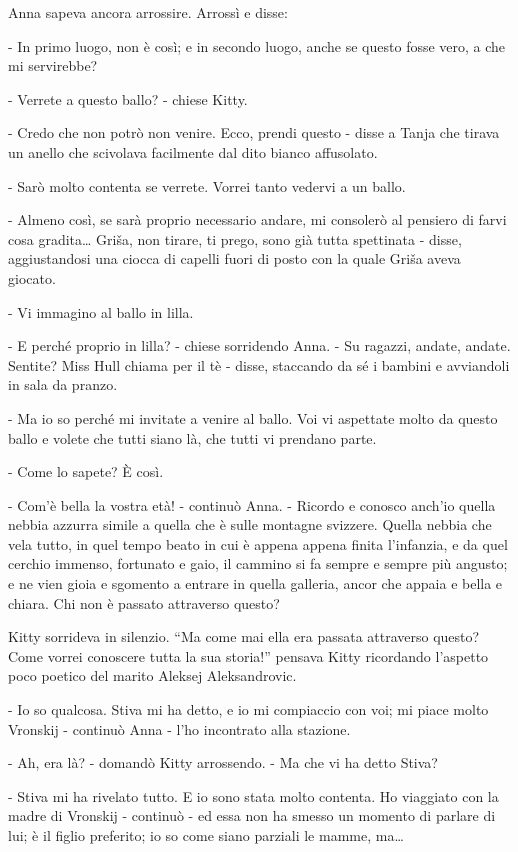 Anna sapeva ancora arrossire. Arrossì e disse: 

- In primo luogo, non è così; e in secondo luogo, anche se questo fosse vero, a che mi servirebbe? 

- Verrete a questo ballo? - chiese Kitty. 

- Credo che non potrò non venire. Ecco, prendi questo - disse a Tanja che tirava un anello che scivolava facilmente dal dito bianco affusolato. 

- Sarò molto contenta se verrete. Vorrei tanto vedervi a un ballo. 

- Almeno così, se sarà proprio necessario andare, mi consolerò al pensiero di farvi cosa gradita\ldots{} Griša, non tirare, ti prego, sono già tutta spettinata - disse, aggiustandosi una ciocca di capelli fuori di posto con la quale Griša aveva giocato. 

- Vi immagino al ballo in lilla. 

- E perché proprio in lilla? - chiese sorridendo Anna. - Su ragazzi, andate, andate. Sentite? Miss Hull chiama per il tè - disse, staccando da sé i bambini e avviandoli in sala da pranzo. 

- Ma io so perché mi invitate a venire al ballo. Voi vi aspettate molto da questo ballo e volete che tutti siano là, che tutti vi prendano parte. 

- Come lo sapete? È così. 

- Com'è bella la vostra età! - continuò Anna. - Ricordo e conosco anch'io quella nebbia azzurra simile a quella che è sulle montagne svizzere. Quella nebbia che vela tutto, in quel tempo beato in cui è appena appena finita l'infanzia, e da quel cerchio immenso, fortunato e gaio, il cammino si fa sempre e sempre più angusto; e ne vien gioia e sgomento a entrare in quella galleria, ancor che appaia e bella e chiara. Chi non è passato attraverso questo? 

Kitty sorrideva in silenzio. ``Ma come mai ella era passata attraverso questo? Come vorrei conoscere tutta la sua storia!'' pensava Kitty ricordando l'aspetto poco poetico del marito Aleksej Aleksandrovic. 

- Io so qualcosa. Stiva mi ha detto, e io mi compiaccio con voi; mi piace molto Vronskij - continuò Anna - l'ho incontrato alla stazione. 

- Ah, era là? - domandò Kitty arrossendo. - Ma che vi ha detto Stiva? 

- Stiva mi ha rivelato tutto. E io sono stata molto contenta. Ho viaggiato con la madre di Vronskij - continuò - ed essa non ha smesso un momento di parlare di lui; è il figlio preferito; io so come siano parziali le mamme, ma\ldots{} 

